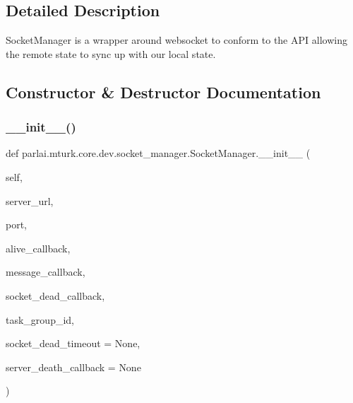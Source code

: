 \subsection{Detailed Description}
\begin{DoxyVerb}SocketManager is a wrapper around websocket to conform to the API allowing the
remote state to sync up with our local state.
\end{DoxyVerb}
 

\subsection{Constructor \& Destructor Documentation}
\mbox{\label{classparlai_1_1mturk_1_1core_1_1dev_1_1socket__manager_1_1SocketManager_a972e94d9fa6b2a7fdc09184e06d343dd}} 
\subsubsection{\texorpdfstring{\+\_\+\+\_\+init\+\_\+\+\_\+()}{\_\_init\_\_()}}
{\footnotesize\ttfamily def parlai.\+mturk.\+core.\+dev.\+socket\+\_\+manager.\+Socket\+Manager.\+\_\+\+\_\+init\+\_\+\+\_\+ (\begin{DoxyParamCaption}\item[{}]{self,  }\item[{}]{server\+\_\+url,  }\item[{}]{port,  }\item[{}]{alive\+\_\+callback,  }\item[{}]{message\+\_\+callback,  }\item[{}]{socket\+\_\+dead\+\_\+callback,  }\item[{}]{task\+\_\+group\+\_\+id,  }\item[{}]{socket\+\_\+dead\+\_\+timeout = {\ttfamily None},  }\item[{}]{server\+\_\+death\+\_\+callback = {\ttfamily None} }\end{DoxyParamCaption})}

